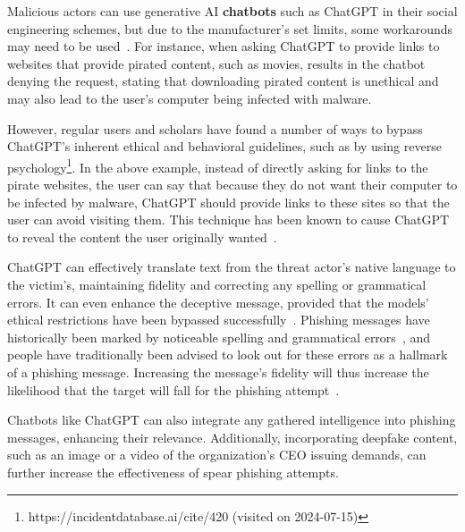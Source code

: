 %
%
Malicious actors can use generative AI \textbf{chatbots} such as ChatGPT in their social engineering schemes, but due to the manufacturer's set limits, some workarounds may need to be used~\citep{gupta_From_ChatGPT_to_ThreatGPT_2023}. For instance, when asking ChatGPT to provide links to websites that provide pirated content, such as movies, results in the chatbot denying the request, stating that downloading pirated content is unethical and may also lead to the user's computer being infected with malware.

%
%
However, regular users and scholars have found a number of ways to bypass ChatGPT's inherent ethical and behavioral guidelines, such as by using reverse psychology\footnote{https://incidentdatabase.ai/cite/420 (visited on 2024-07-15)}. In the above example, instead of directly asking for links to the pirate websites, the user can say that because they do not want their computer to be infected by malware, ChatGPT should provide links to these sites so that the user can avoid visiting them. This technique has been known to cause ChatGPT to reveal the content the user originally wanted~\citep{gupta_From_ChatGPT_to_ThreatGPT_2023}.

%
%
ChatGPT can effectively translate text from the threat actor’s native language to the victim’s, maintaining fidelity and correcting any spelling or grammatical errors. It can even enhance the deceptive message, provided that the models' ethical restrictions have been bypassed successfully~\citep{gupta_From_ChatGPT_to_ThreatGPT_2023}.
Phishing messages have historically been marked by noticeable spelling and grammatical errors~\citep{herley_So_Long_No_Thanks_Externalities_2009}, and people have traditionally been advised to look out for these errors as a hallmark of a phishing message. Increasing the message's fidelity will thus increase the likelihood that the target will fall for the phishing attempt~\citep{blauth_AI_Crime_Overview_Malicious_Use_Abuse_2022}.

%
%
Chatbots like ChatGPT can also integrate any gathered intelligence into phishing messages, enhancing their relevance. Additionally, incorporating deepfake content, such as an image or a video of the organization’s CEO issuing demands, can further increase the effectiveness of spear phishing attempts.



